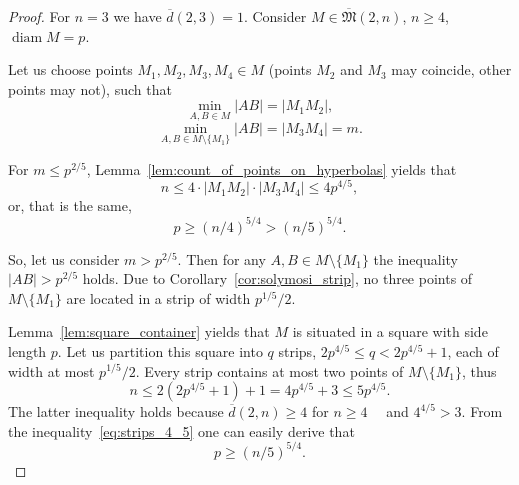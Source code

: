\documentclass[a4paper,14pt]{article} %
\theoremstyle{plain}
\theoremstyle{definition}
\begin{document}
\begin{proof}
	For $n = 3$ we have $\overline{d}(2,3) = 1$.
	Consider $M\in\overline{\mathfrak{M}}(2,n)$, $n \geq 4$, $\operatorname{diam} M = p$.

	Let us choose points $M_1, M_2, M_3, M_4 \in M$
	(points $M_2$ and $M_3$ may coincide, other points may not), such that
	\begin{equation}
		\min_{A, B \in M} |AB| = |M_1 M_2|
		,
	\end{equation}
	\begin{equation}
		\min_{A, B \in M \setminus \{M_1\}} |AB| = |M_3 M_4| = m
		.
	\end{equation}

	For $m \leq p^{2/5}$, Lemma~\ref{lem:count_of_points_on_hyperbolas} yields that
	\begin{equation}
		n \leq 4 \cdot |M_1 M_2| \cdot |M_3 M_4| \leq  4 p^{4/5}
		,
	\end{equation}
	or, that is the same,
	\begin{equation}
		\label{eq:hyperbolas_5_4}
		p \geq (n/4) ^ {5/4} > (n/5) ^ {5/4}
		.
	\end{equation}

	So, let us consider $m > p^{2/5}$.
	Then for any $A,B \in M\setminus\{M_1\}$ the inequality $|AB| > p^{2/5}$ holds.
	Due to Corollary~\ref{cor:solymosi_strip}, no three points of $M\setminus\{M_1\}$
	are located in a strip of width $p^{1/5} / 2$.



	Lemma~\ref{lem:square_container} yields that $M$ is situated in a square with side length $p$.
	Let us partition this square into $q$ strips, $2p^{4/5} \leq q < 2p^{4/5} + 1$, each of width at most $p^{1/5} / 2$.
	Every strip contains at most two points of  $M\setminus\{M_1\}$,
	thus
	\begin{equation}
		\label{eq:strips_4_5}
		n \leq 2(2p^{4/5} + 1) + 1
		= 4p^{4/5}+3
		\leq 5 p^{4/5}
		.
	\end{equation}
	The latter inequality holds because $\overline{d}(2,n) \geq 4$ for $n\geq 4$~~\cite{kurz2008minimum}
	and $4^{4/5}>3$.
	From the inequality~\eqref{eq:strips_4_5} one can easily derive that
	\begin{equation}
		\label{eq:strips_5_4}
		p \geq (n/5) ^ {5/4}
		.
	\end{equation}
\end{proof}
\end{document}
